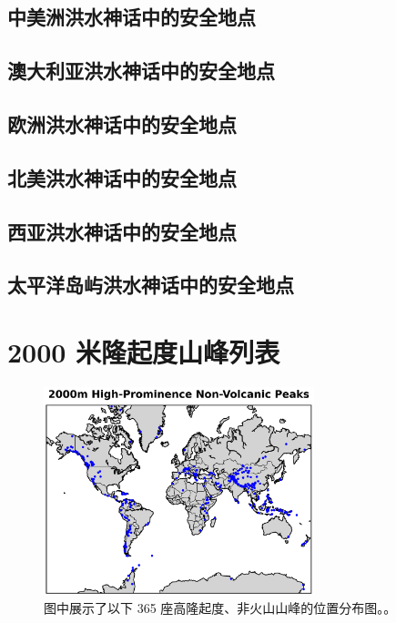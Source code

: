 \documentclass[10pt,twocolumn,letterpaper]{article}
\begin{document}
\subsection{中美洲洪水神话中的安全地点}

\subsection{澳大利亚洪水神话中的安全地点}

\subsection{欧洲洪水神话中的安全地点}
\subsection{北美洪水神话中的安全地点}

\subsection{西亚洪水神话中的安全地点}
\subsection{太平洋岛屿洪水神话中的安全地点}

\clearpage
\twocolumn
\section{2000 米隆起度山峰列表}

\begin{figure}[t]
\begin{center}
\includegraphics[width=0.7\textwidth]{peaks.png}
\end{center}
   \caption{图中展示了以下 365 座高隆起度、非火山山峰的位置分布图。\cite{62}。}
   \label{fig:22}
\end{figure}
\end{document}
